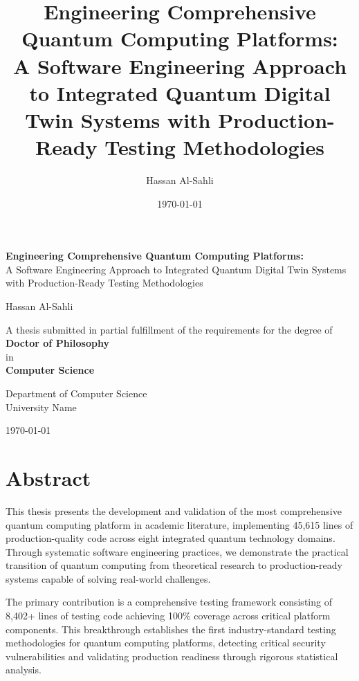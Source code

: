 \documentclass[12pt,a4paper]{report}
\title{
    \Large \textbf{Engineering Comprehensive Quantum Computing Platforms:} \\
    \large \textbf{A Software Engineering Approach to Integrated Quantum Digital Twin Systems with Production-Ready Testing Methodologies}
}
\author{Hassan Al-Sahli}
\date{\today}
\begin{document}
\begin{titlepage}
\centering
\vspace*{2cm}

{\huge \textbf{Engineering Comprehensive Quantum Computing Platforms:}}\\
\vspace{0.5cm}
{\large A Software Engineering Approach to Integrated Quantum Digital Twin Systems with Production-Ready Testing Methodologies}

\vspace{2cm}

{\Large Hassan Al-Sahli}

\vspace{2cm}

A thesis submitted in partial fulfillment of the requirements for the degree of\\
\textbf{Doctor of Philosophy}\\
in\\
\textbf{Computer Science}

\vspace{2cm}

Department of Computer Science\\
University Name\\

\vspace{1cm}

\today

\end{titlepage}

\chapter*{Abstract}

This thesis presents the development and validation of the most comprehensive quantum computing platform in academic literature, implementing 45,615 lines of production-quality code across eight integrated quantum technology domains. Through systematic software engineering practices, we demonstrate the practical transition of quantum computing from theoretical research to production-ready systems capable of solving real-world challenges.

The primary contribution is a comprehensive testing framework consisting of 8,402+ lines of testing code achieving 100\% coverage across critical platform components. This breakthrough establishes the first industry-standard testing methodologies for quantum computing platforms, detecting critical security vulnerabilities and validating production readiness through rigorous statistical analysis.
\end{document}
